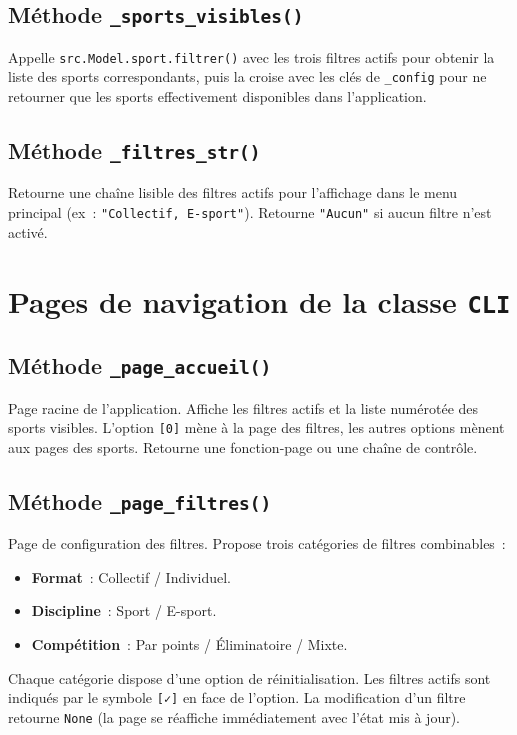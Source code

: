 \documentclass[12pt,a4paper]{article}
\begin{document}
\subsection{Méthode \texttt{\_sports\_visibles()}}
Appelle \texttt{src.Model.sport.filtrer()} avec les trois filtres actifs
pour obtenir la liste des sports correspondants, puis la croise avec
les clés de \texttt{\_config} pour ne retourner que les sports
effectivement disponibles dans l'application.

\subsection{Méthode \texttt{\_filtres\_str()}}
Retourne une chaîne lisible des filtres actifs pour l'affichage dans
le menu principal (ex~: \texttt{"Collectif, E-sport"}). Retourne
\texttt{"Aucun"} si aucun filtre n'est activé.

\section{Pages de navigation de la classe \texttt{CLI}}

\subsection{Méthode \texttt{\_page\_accueil()}}
Page racine de l'application. Affiche les filtres actifs et la liste
numérotée des sports visibles. L'option \texttt{[0]} mène à la page
des filtres, les autres options mènent aux pages des sports. Retourne
une fonction-page ou une chaîne de contrôle.

\subsection{Méthode \texttt{\_page\_filtres()}}
Page de configuration des filtres. Propose trois catégories de filtres
combinables~:
\begin{itemize}
    \item \textbf{Format}~: Collectif / Individuel.
    \item \textbf{Discipline}~: Sport / E-sport.
    \item \textbf{Compétition}~: Par points / Éliminatoire / Mixte.
\end{itemize}
Chaque catégorie dispose d'une option de réinitialisation. Les filtres
actifs sont indiqués par le symbole \texttt{[✓]} en face de l'option.
La modification d'un filtre retourne \texttt{None} (la page se
réaffiche immédiatement avec l'état mis à jour).
\end{document}
